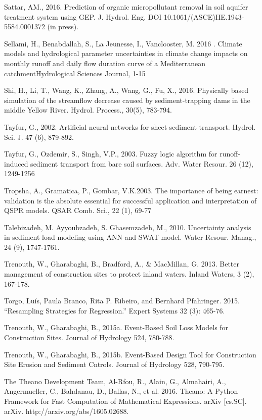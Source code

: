 \begin{hangingpar}{2em}
Sattar, AM., 2016. Prediction of organic micropollutant removal in soil aquifer treatment system using GEP. J. Hydrol. Eng. DOI 10.1061/(ASCE)HE.1943-5584.0001372 (in press).

Sellami, H., Benabdallah, S., La Jeunesse, I., Vanclooster, M. 2016	. Climate models and hydrological parameter uncertainties in climate change impacts on monthly runoff and daily flow duration curve of a Mediterranean catchmentHydrological Sciences Journal, 1-15

Shi, H., Li, T., Wang, K., Zhang, A., Wang, G., Fu, X., 2016. Physically based simulation of the streamflow decrease caused by sediment-trapping dams in the middle Yellow River. Hydrol. Process., 30(5), 783-794.

Tayfur, G., 2002. Artificial neural networks for sheet sediment transport. Hydrol. Sci. J. 47 (6), 879-892.

Tayfur, G., Ozdemir, S., Singh, V.P., 2003. Fuzzy logic algorithm for runoff-induced sediment transport from bare soil surfaces. Adv. Water Resour. 26 (12), 1249-1256 

Tropsha, A., Gramatica, P., Gombar, V.K.2003. The importance of being earnest: validation is the absolute essential for successful application and interpretation of QSPR models. QSAR Comb. Sci., 22 (1), 69-77

Talebizadeh, M. Ayyoubzadeh, S.  Ghasemzadeh, M., 2010. Uncertainty analysis in sediment load modeling using ANN and SWAT model. Water Resour. Manag., 24 (9), 1747-1761.

Trenouth, W., Gharabaghi, B., Bradford, A., \& MacMillan, G. 2013.  Better management of construction sites to protect inland waters.   Inland Waters, 3 (2), 167-178.

Torgo, Luís, Paula Branco, Rita P. Ribeiro, and Bernhard Pfahringer. 2015. ``Resampling Strategies for Regression.'' Expert Systems 32 (3): 465-76.

Trenouth, W., Gharabaghi, B., 2015a.  Event-Based Soil Loss Models for Construction Sites. Journal of Hydrology 524, 780-788. 

Trenouth, W., Gharabaghi, B., 2015b.  Event-Based Design Tool for Construction Site Erosion and Sediment Cntrols.   Journal of Hydrology 528, 790-795.

The Theano Development Team, Al-Rfou, R., Alain, G.,  Almahairi, A.,  Angermueller, C.,  Bahdanau, D., Ballas, N., et al. 2016. Theano: A Python Framework for Fast Computation of Mathematical Expressions. arXiv [cs.SC]. arXiv. http://arxiv.org/abs/1605.02688.


\end{hangingpar}
